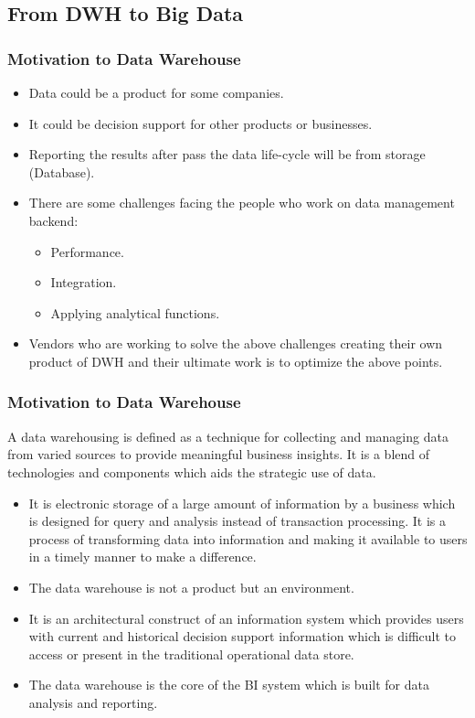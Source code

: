 

\subsection{From DWH to Big Data}
\begin{frame}
\frametitle{Motivation to Data Warehouse}
\begin{itemize}[<+->]
	\item Data could be a product for some companies.
	\item It could be decision support for other products or businesses.
	\item Reporting the results after pass the data life-cycle will be from storage (Database).
	\item There are some challenges facing the people who work on data management backend:
	\begin{itemize}
		\item Performance.
		\item Integration.
		\item Applying analytical functions. %
	\end{itemize}
	\item Vendors who are working to solve the above challenges creating their own product of DWH and their ultimate work is to optimize the above points.
\end{itemize}
\end{frame}

\begin{frame}
\frametitle{Motivation to Data Warehouse}

\begin{definition} A data warehousing is defined as a technique for collecting and managing data from varied sources to provide meaningful business insights. It is a blend of technologies and components which aids the strategic use of data.\footnotemark
\end{definition}
\begin{itemize}
	\item It is electronic storage of a large amount of information by a business which is designed for query and analysis instead of transaction processing. It is a process of transforming data into information and making it available to users in a timely manner to make a difference.
	\item The data warehouse is not a product but an environment.
	\item It is an architectural construct of an information system which provides users with current and historical decision support information which is difficult to access or present in the traditional operational data store.
	\item The data warehouse is the core of the BI system which is built for data analysis and reporting.
	
\end{itemize}
\end{frame}


